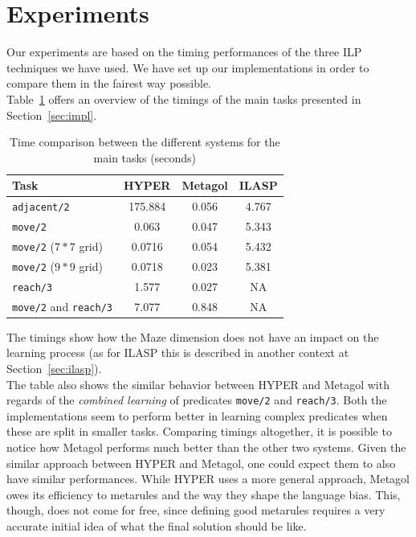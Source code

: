 \section{Experiments}\label{sec:exp}
Our experiments are based on the timing performances of the three ILP techniques
we have used. We have set up our implementations in order to compare them in the
fairest way possible.\\
Table~\ref{tab:prf_cmp} offers an overview of the timings of the main tasks presented in Section~\ref{sec:impl}.
{
\begin{center}
    \begin{table}[h]
    \centering
    \begin{tabular}{ |l|c|c|c| } 
        \hline
        Task & \textbf{HYPER} & \textbf{Metagol} & \textbf{ILASP} \\ \hline
        \texttt{adjacent/2} & 175.884 & 0.056 & 4.767 \\ 
        \texttt{move/2} & 0.063 & 0.047 & 5.343 \\ 
        \texttt{move/2} (\(7*7\) grid) & 0.0716 & 0.054 & 5.432 \\
        \texttt{move/2} (\(9*9\) grid) & 0.0718 & 0.023 & 5.381 \\
        \texttt{reach/3} & 1.577 & 0.027 & NA \\ 
        \texttt{move/2} and \texttt{reach/3} & 7.077 & 0.848 & NA \\ 
        \hline
    \end{tabular}
    \caption{\label{tab:prf_cmp}Time comparison between the different systems for the main tasks (seconds)}
\end{table}
\end{center}
}
The timings show how the Maze dimension does not have an impact on the learning process (as for ILASP this is described
in another context at Section~\ref{sec:ilasp}).\\
The table also shows the similar behavior between HYPER and Metagol with regards of the \emph{combined
learning} of predicates \texttt{move/2} and \texttt{reach/3}. Both the implementations seem to
perform better in learning complex predicates when these are split in smaller tasks.
Comparing timings altogether, it is possible to notice how Metagol performs much better than the other
two systems. Given the similar approach between HYPER and Metagol, one could expect them
to also have similar performances. While HYPER uses a more general approach, Metagol owes its efficiency to metarules and the way they shape the language bias. This, though, does not come
for free, since defining good metarules requires a very accurate initial idea of what the final solution should be like.\\

